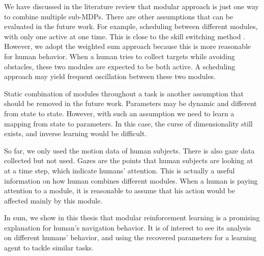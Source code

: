 \documentclass[12pt]{report}	%
\theoremstyle{definition}
\theoremstyle{remark}
\begin{document}
We have discussed in the literature review that modular approach is just one way to combine multiple
sub-MDPs. There are other assumptions that can be evaluated in the future work.
For example, scheduling between
different modules, with only one active at one time. This is close to the skill
switching method \cite{konidaris2009skill}. However, we adopt the
weighted sum approach because this is more reasonable for human behavior. When a
human tries to collect targets while avoiding obstacles, these two modules are
expected to be both active. A scheduling approach may yield frequent oscillation
between these two modules.

Static combination of modules throughout a task is another assumption that
should be removed in the future work. Parameters may be dynamic and different from
state to state.  However, with such an assumption we need to learn a mapping
from state to parameters. In this case, the curse of dimensionality still exists,
and inverse learning would be difficult.

So far, we only used the motion data of human subjects. There is also gaze data
collected but not used. Gazes are the points that human subjects are looking at
at a time step, which indicate humans' attention. This is actually a useful
information on how human combines different modules. When a human is paying
attention to a module, it is reasonable to assume that his action would be
affected mainly by this module.

In sum, we show in this thesis that modular reinforcement learning is a
promising explanation for human's navigation behavior. It is of interest to see
its analysis on different humans' behavior, and using the recovered parameters
for a learning agent to tackle similar tasks.


%
%
\appendices
{}%

\end{document}
